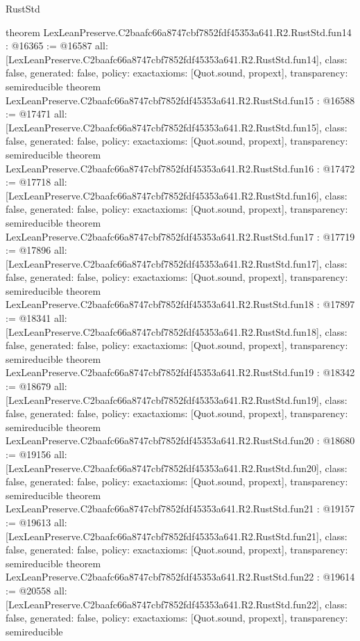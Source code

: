 \begin{lexlean}{RustStd}
\begin{coremodule}
{}
theorem LexLeanPreserve.C2baafc66a8747cbf7852fdf45353a641.R2.RustStd.fun14 : @16365 := @16587 {
  all: [LexLeanPreserve.C2baafc66a8747cbf7852fdf45353a641.R2.RustStd.fun14],
  class: false,
  generated: false,
  policy: exact{axioms: [Quot.sound, propext]},
  transparency: semireducible
}
theorem LexLeanPreserve.C2baafc66a8747cbf7852fdf45353a641.R2.RustStd.fun15 : @16588 := @17471 {
  all: [LexLeanPreserve.C2baafc66a8747cbf7852fdf45353a641.R2.RustStd.fun15],
  class: false,
  generated: false,
  policy: exact{axioms: [Quot.sound, propext]},
  transparency: semireducible
}
theorem LexLeanPreserve.C2baafc66a8747cbf7852fdf45353a641.R2.RustStd.fun16 : @17472 := @17718 {
  all: [LexLeanPreserve.C2baafc66a8747cbf7852fdf45353a641.R2.RustStd.fun16],
  class: false,
  generated: false,
  policy: exact{axioms: [Quot.sound, propext]},
  transparency: semireducible
}
theorem LexLeanPreserve.C2baafc66a8747cbf7852fdf45353a641.R2.RustStd.fun17 : @17719 := @17896 {
  all: [LexLeanPreserve.C2baafc66a8747cbf7852fdf45353a641.R2.RustStd.fun17],
  class: false,
  generated: false,
  policy: exact{axioms: [Quot.sound, propext]},
  transparency: semireducible
}
theorem LexLeanPreserve.C2baafc66a8747cbf7852fdf45353a641.R2.RustStd.fun18 : @17897 := @18341 {
  all: [LexLeanPreserve.C2baafc66a8747cbf7852fdf45353a641.R2.RustStd.fun18],
  class: false,
  generated: false,
  policy: exact{axioms: [Quot.sound, propext]},
  transparency: semireducible
}
theorem LexLeanPreserve.C2baafc66a8747cbf7852fdf45353a641.R2.RustStd.fun19 : @18342 := @18679 {
  all: [LexLeanPreserve.C2baafc66a8747cbf7852fdf45353a641.R2.RustStd.fun19],
  class: false,
  generated: false,
  policy: exact{axioms: [Quot.sound, propext]},
  transparency: semireducible
}
theorem LexLeanPreserve.C2baafc66a8747cbf7852fdf45353a641.R2.RustStd.fun20 : @18680 := @19156 {
  all: [LexLeanPreserve.C2baafc66a8747cbf7852fdf45353a641.R2.RustStd.fun20],
  class: false,
  generated: false,
  policy: exact{axioms: [Quot.sound, propext]},
  transparency: semireducible
}
theorem LexLeanPreserve.C2baafc66a8747cbf7852fdf45353a641.R2.RustStd.fun21 : @19157 := @19613 {
  all: [LexLeanPreserve.C2baafc66a8747cbf7852fdf45353a641.R2.RustStd.fun21],
  class: false,
  generated: false,
  policy: exact{axioms: [Quot.sound, propext]},
  transparency: semireducible
}
theorem LexLeanPreserve.C2baafc66a8747cbf7852fdf45353a641.R2.RustStd.fun22 : @19614 := @20558 {
  all: [LexLeanPreserve.C2baafc66a8747cbf7852fdf45353a641.R2.RustStd.fun22],
  class: false,
  generated: false,
  policy: exact{axioms: [Quot.sound, propext]},
  transparency: semireducible
}
\end{coremodule}
\end{lexlean}
